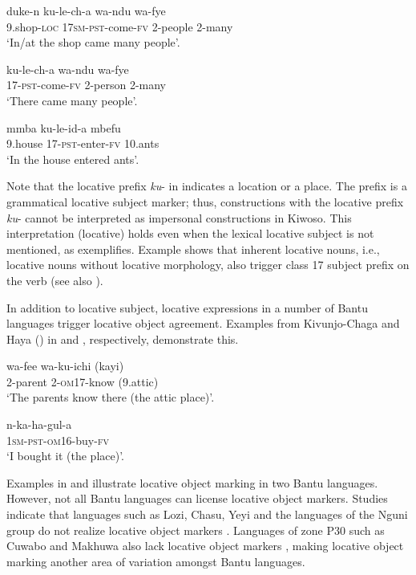 \documentclass[output=paper]{langscibook}
\begin{document}
\ea\label{ex:mallya:15}
    \ea\label{ex:mallya:15a}
    \gll duke-n          ku-le-ch-a      wa-ndu      wa-fye\\
       9.shop-\textsc{loc}    17\textsc{sm}-\textsc{pst}-come-\textsc{fv}  2-people    2-many\\
    \glt  ‘In/at the shop came many people’.

    \ex\label{ex:mallya:15b}
    \gll ku-le-ch-a        wa-ndu        wa-fye\\
       17-\textsc{pst}-come-\textsc{fv}      2-person      2-many\\
    \glt  ‘There came many people’.

    \ex\label{ex:mallya:15c}
    \gll mmba      ku-le-id-a          mbefu\\
     9.house    17-\textsc{pst}-enter-\textsc{fv}    10.ants\\
    \glt ‘In the house entered ants’.
    \z
\z

Note that the locative prefix \textit{ku}{}- in  indicates a location or a place. The prefix is a grammatical locative subject marker; thus, constructions with the locative prefix \textit{ku}{}- cannot be interpreted as impersonal constructions in Kiwoso. This interpretation (locative) holds even when the lexical locative subject is not mentioned, as  exemplifies. Example  shows that inherent locative nouns, i.e., locative nouns without locative morphology, also trigger class 17 subject prefix on the verb (see also \citealt{Mallya2016}).

In addition to locative subject, locative expressions in a number of Bantu languages trigger locative object agreement. Examples from Kivunjo-Chaga \citep[138]{Moshi1995} and Haya (\citealt[282]{RiedelMarten2012}) in  and , respectively, demonstrate this.

  \ea\label{ex:mallya:16}      
  \gll wa-fee      wa-ku-ichi      (kayi)\\
    2-parent    2-\textsc{om}17-know    (9.attic)\\
   \glt ‘The parents know there (the attic place)’.
\z

 \ea\label{ex:mallya:17}
 \gll n-ka-ha-gul-a\\
  1\textsc{sm}-\textsc{pst}-\textsc{om}16-buy-\textsc{fv}\\
 \glt ‘I bought it (the place)’.
\z

Examples in  and  illustrate locative object marking in two Bantu languages. However, not all Bantu languages can license locative object markers. Studies indicate that languages such as Lozi, Chasu, Yeyi and the languages of the Nguni group do not realize locative object markers \citep{MartenEtAl2007}. Languages of zone P30 such as Cuwabo and Makhuwa also lack locative object markers \citep{Guérois2016}, making locative object marking another area of variation amongst Bantu languages.
\end{document}
